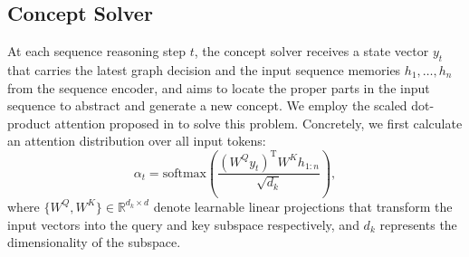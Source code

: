\documentclass[11pt,a4paper]{article}
\begin{document}
	\subsection{Concept Solver}
	At each sequence reasoning step $t$, the concept solver receives a state vector $y_t$ that carries the latest graph decision and the input sequence memories $h_1, \ldots, h_n$ from the sequence encoder, and aims to locate the proper parts in the input sequence to abstract and generate a new concept. We employ the scaled dot-product attention proposed in  to solve this problem. Concretely, we first calculate an attention distribution over all input tokens:
	\begin{equation}
	\alpha_t = \text{softmax}(\frac{(W^{Q}y_t)^{\text{T}} W^{K} h_{1:n}}{\sqrt{d_k}}),
	\nonumber
	\end{equation}
	where $\{W^{Q}, W^{K}\}\in \mathbb{R}^{d_k \times d}$ denote learnable linear projections that transform the input vectors into the query and key subspace respectively, and $d_k$ represents the dimensionality of the subspace.
	
\end{document}
